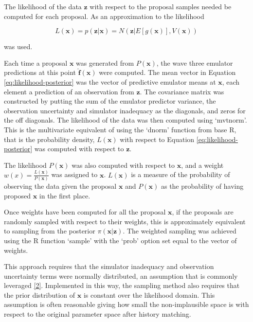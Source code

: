 \documentclass[
  12pt,
  a4paper,
  twoside]{book}
\begin{document}
The likelihood of the data \(\mathbf{z}\) with respect to the proposal samples needed be computed for each proposal. As an approximation to the likelihood

\begin{equation}
\label{eq:likelihood-posterior}
L(\mathbf{x}) = p\left(\mathbf{z}| \mathbf{x}\right) = N\left( \mathbf{z}| E[g(\mathbf{x})], V(\mathbf{x})\right)
\end{equation}

was used.

Each time a proposal \(\mathbf{x}\) was generated from \(P(\mathbf{x})\), the wave three emulator predictions at this point \(\mathbf{\hat{f}(x)}\) were computed. The mean vector in Equation \eqref{eq:likelihood-posterior} was the vector of predictive emulator means at \(\mathbf{x}\), each element a prediction of an observation from \(\mathbf{z}\). The covariance matrix was constructed by putting the sum of the emulator predictor variance, the observation uncertainty and simulator inadequacy as the diagonals, and zeros for the off diagonals. The likelihood of the data was then computed using `mvtnorm'. This is the multivariate equivalent of using the `dnorm' function from base R, that is the probability density, \(L(\mathbf{x})\) with respect to Equation \eqref{eq:likelihood-posterior} was computed with respect to \(\mathbf{z}\).

The likelihood \(P(\mathbf{x})\) was also computed with respect to \(\mathbf{x}\), and a weight \(w(x) = \frac{L(\mathbf{x})}{P(\mathbf{x})}\) was assigned to \(\mathbf{x}\). \(L(\mathbf{x})\) is a measure of the probability of observing the data given the proposal \(\mathbf{x}\) and \(P(\mathbf{x})\) as the probability of having proposed \(\mathbf{x}\) in the first place.

Once weights have been computed for all the proposal \(\mathbf{x}\), if the proposals are randomly sampled with respect to their weights, this is approximately equivalent to sampling from the posterior \(\pi(\mathbf{x}|\mathbf{z})\). The weighted sampling was achieved using the R function `sample' with the `prob' option set equal to the vector of weights.

This approach requires that the simulator inadequacy and observation uncertainty terms were normally distributed, an assumption that is commonly leveraged \protect\hyperlink{ref-bower2010galaxy}{{[}2{]}}. Implemented in this way, the sampling method also requires that the prior distribution of \(\mathbf{x}\) is constant over the likelihood domain. This assumption is often reasonable giving how small the non-implausible space is with respect to the original parameter space after history matching.
\end{document}
